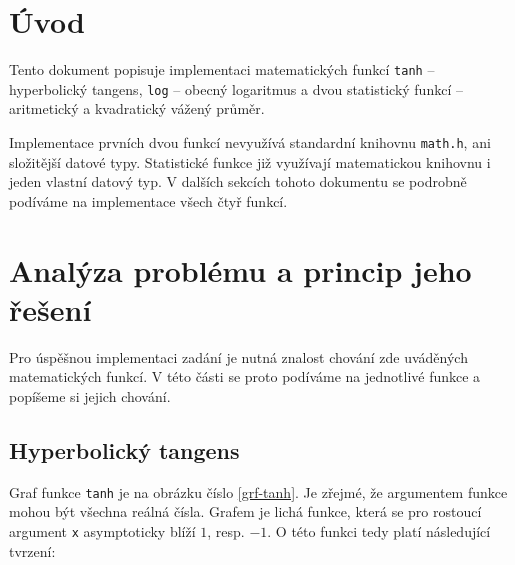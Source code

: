 \documentclass[12pt,a4paper,titlepage,final]{article}
\begin{document}
\def\author{Vlastimil Slinták}
\def\email{xslint01@stud.feec.vutbr.cz}
\def\projname{Iterační výpočty}



\pagestyle{plain}
\setcounter{page}{1}
\tableofcontents

\newpage
\pagestyle{plain}
\setcounter{page}{1}

\section{Úvod} \label{uvod}

Tento dokument popisuje implementaci matematických funkcí \texttt{tanh} --
hyperbolický tangens, \texttt{log} -- obecný logaritmus a dvou statistický
funkcí -- aritmetický a kvadratický vážený průměr.

Implementace prvních dvou funkcí nevyužívá standardní knihovnu \texttt{math.h},
ani složitější datové typy. Statistické funkce již využívají matematickou
knihovnu i jeden vlastní datový typ. V dalších sekcích tohoto dokumentu
se podrobně podíváme na implementace všech čtyř funkcí.

\section{Analýza problému a princip jeho řešení} \label{analyza}
Pro úspěšnou implementaci zadání je nutná znalost chování zde uváděných
matematických funkcí. V této části se proto podíváme na jednotlivé funkce
a popíšeme si jejich chování.

\subsection{Hyperbolický tangens}
  Graf funkce \texttt{tanh} je na obrázku číslo \ref{grf-tanh}. Je zřejmé, že
  argumentem funkce mohou být všechna reálná čísla. Grafem je lichá funkce,
  která se pro rostoucí argument \texttt{x} asymptoticky blíží $1$, resp. $-1$.
  O této funkci tedy platí následující tvrzení:
\end{document}
